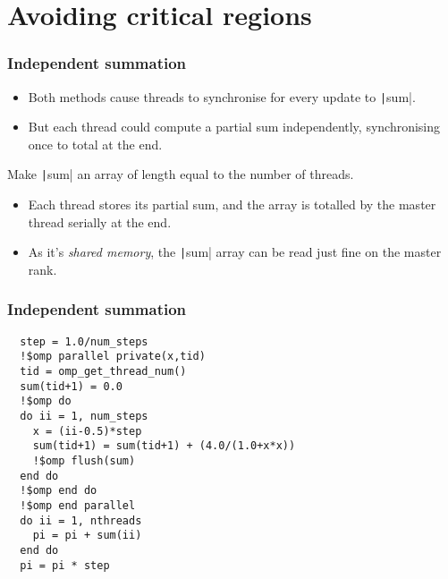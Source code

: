 \documentclass{beamer}
\begin{document}
\section{Avoiding critical regions}
\begin{frame}
\frametitle{Independent summation}
\begin{itemize}
  \item Both methods cause threads to synchronise for every update to \texttt|sum|.
  \item But each thread could compute a partial sum independently, synchronising once to total at the end.
\end{itemize}

\vfill

Make \texttt|sum| an array of length equal to the number of threads.
\begin{itemize}
  \item Each thread stores its partial sum, and the array is totalled by the master thread serially at the end.
  \item As it's \emph{shared memory}, the \texttt|sum| array can be read just fine on the master rank.
\end{itemize}
\end{frame}

\begin{frame}[fragile]
\frametitle{Independent summation}
\begin{verbatim}
  step = 1.0/num_steps
  !$omp parallel private(x,tid)
  tid = omp_get_thread_num()
  sum(tid+1) = 0.0
  !$omp do
  do ii = 1, num_steps
    x = (ii-0.5)*step
    sum(tid+1) = sum(tid+1) + (4.0/(1.0+x*x))
    !$omp flush(sum)
  end do
  !$omp end do
  !$omp end parallel
  do ii = 1, nthreads
    pi = pi + sum(ii)
  end do
  pi = pi * step
\end{verbatim}
\end{frame}
\end{document}
